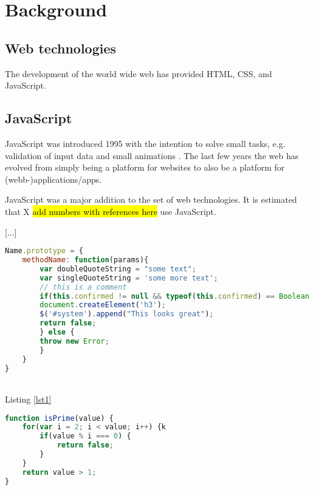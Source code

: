 \section{Background}

\subsection{Web technologies}

The development of the world wide web has provided HTML, CSS, and JavaScript.

\subsection{JavaScript}

JavaScript was introduced 1995 with the intention to solve small tasks, e.g. validation of input data and small animations \parencite{Moller2018}. The last few years the web has evolved from simply being a platform for websites to also be a platform for (webb-)applications/apps.

JavaScript was a major addition to the set of web technologies. It is estimated that X \hl{add numbers with references here} use JavaScript.

[...]

\clearpage

\begin{lstlisting}[label=lst1,language=JavaScript,numbers=none,caption=prototype.js,frame=shadowbox]
Name.prototype = {
    methodName: function(params){
        var doubleQuoteString = "some text";
        var singleQuoteString = 'some more text';
        // this is a comment
        if(this.confirmed != null && typeof(this.confirmed) == Boolean && this.confirmed == true){
        document.createElement('h3');
        $('#system').append("This looks great");
        return false;
        } else {
        throw new Error;
        }
    }
}
\end{lstlisting}

\blindtext\\
Listing \ref{lst1}

\begin{lstlisting}[language=JavaScript,numbers=none,caption=Listing 2,frame=shadowbox]
function isPrime(value) {
    for(var i = 2; i < value; i++) {k
        if(value % i === 0) {
            return false;
        }
    }
    return value > 1;
}
\end{lstlisting}

\blindtext


